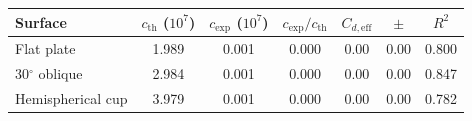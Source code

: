 \begin{tabular}{l S[table-format=1.3] S[table-format=1.3] S[table-format=1.2] S[table-format=1.2] S[table-format=1.2] S[table-format=1.3]}
\toprule
Surface & {$c_{\mathrm{th}}$ ($10^{7}$)} & {$c_{\exp}$ ($10^{7}$)} & {$c_{\exp}/c_{\mathrm{th}}$} & {$C_{d,\mathrm{eff}}$} & {$\pm$} & {$R^2$} \\
\midrule
Flat plate & 1.989 & 0.001 & 0.000 & 0.00 & 0.00 & 0.800 \\
30$^\circ$ oblique & 2.984 & 0.001 & 0.000 & 0.00 & 0.00 & 0.847 \\
Hemispherical cup & 3.979 & 0.001 & 0.000 & 0.00 & 0.00 & 0.782 \\
\bottomrule
\end{tabular}
